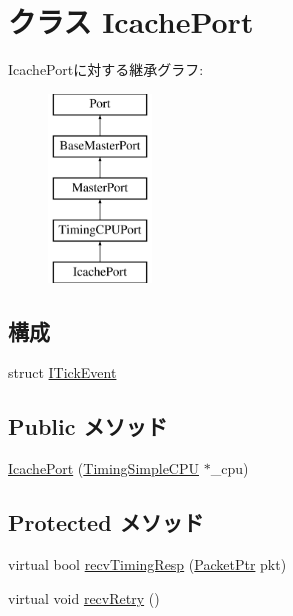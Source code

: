 \hypertarget{classTimingSimpleCPU_1_1IcachePort}{
\section{クラス IcachePort}
\label{classTimingSimpleCPU_1_1IcachePort}
}
IcachePortに対する継承グラフ:\begin{figure}[H]
\begin{center}
\leavevmode
\includegraphics[height=5cm]{classTimingSimpleCPU_1_1IcachePort}
\end{center}
\end{figure}
\subsection*{構成}
\begin{DoxyCompactItemize}
\item 
struct \hyperlink{structTimingSimpleCPU_1_1IcachePort_1_1ITickEvent}{ITickEvent}
\end{DoxyCompactItemize}
\subsection*{Public メソッド}
\begin{DoxyCompactItemize}
\item 
\hyperlink{classTimingSimpleCPU_1_1IcachePort_aecbabb77fb044c96b054b9e97ab47863}{IcachePort} (\hyperlink{classTimingSimpleCPU_1_1TimingSimpleCPU}{TimingSimpleCPU} $\ast$\_\-cpu)
\end{DoxyCompactItemize}
\subsection*{Protected メソッド}
\begin{DoxyCompactItemize}
\item 
virtual bool \hyperlink{classTimingSimpleCPU_1_1IcachePort_a482dba5588f4bee43e498875a61e5e0b}{recvTimingResp} (\hyperlink{classPacket}{PacketPtr} pkt)
\item 
virtual void \hyperlink{classTimingSimpleCPU_1_1IcachePort_a29cb5a4f98063ce6e9210eacbdb35298}{recvRetry} ()
\end{DoxyCompactItemize}
